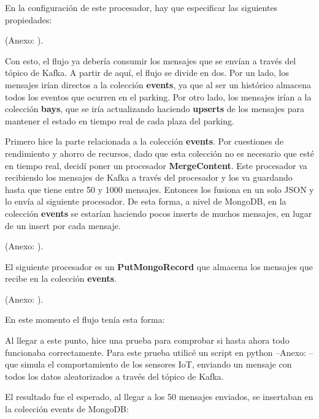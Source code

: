\documentclass{../../../miPlantilla}
\begin{document}
En la configuración de este procesador, hay que especificar las siguientes propiedades:
\begin{center}
  {\small(Anexo: )}.
\end{center}

Con esto, el flujo ya debería consumir los mensajes que se envían a través del tópico de Kafka. A partir de aquí, el flujo se divide en dos.
Por un lado, los mensajes irían directos a la colección \textbf{events}, ya que al ser un histórico almacena todos los eventos que ocurren en el parking.
Por otro lado, los mensajes irían a la colección \textbf{bays}, que se iría actualizando haciendo \textbf{upserts} de los mensajes para mantener el estado 
en tiempo real de cada plaza del parking.

Primero hice la parte relacionada a la colección \textbf{events}. Por cuestiones de rendimiento y ahorro de recursos, dado que esta colección no es necesario que esté
en tiempo real, decidí poner un procesador \textbf{MergeContent}. Este procesador va recibiendo los mensajes de Kafka a través del procesador y los va guardando
hasta que tiene entre 50 y 1000 mensajes. Entonces los fusiona en un solo JSON y lo envía al siguiente procesador. De esta forma, a nivel de MongoDB, en la colección \textbf{events}
se estarían haciendo pocos inserts de muchos mensajes, en lugar de un insert por cada mensaje.
\begin{center}
  {\small(Anexo: )}.
\end{center}

El siguiente procesador es un \textbf{PutMongoRecord} que almacena los mensajes que recibe en la colección \textbf{events}. 
\begin{center}
  {\small(Anexo: )}.
\end{center}

En este momento el flujo tenía esta forma:

Al llegar a este punto, hice una prueba para comprobar si hasta ahora todo funcionaba correctamente. Para este prueba utilicé un script en python --Anexo: -- que simula el comportamiento
de los sensores IoT, enviando un mensaje con todos los datos aleatorizados a través del tópico de Kafka.

El resultado fue el esperado, al llegar a los 50 mensajes enviados, se insertaban en la colección events de MongoDB:
\end{document}
